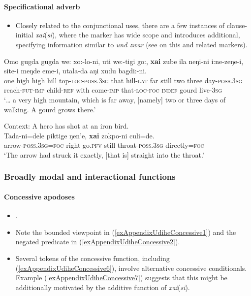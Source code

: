 \paragraph{Specificational adverb}\label{appendixUdiheSpecificational}
\begin{itemize}
	\item Closely related to the conjunctional uses, there are a few instances of clause-initial \mbox{\textit{xai}(\textit{si})}, where the marker has wide scope and introduces additional, specifying information similar to  \textit{und zwar} (see \cite{OneaVolodina2011} on this and related markers).
\end{itemize}

\begin{exe}
	\ex
	\gll Omo gugda gugda we: xo:-lo-ni, uti we:-tigi go:, \textbf{xai} zube ila neŋi-ni i:ne-zeŋe-i, site-i meŋde eme-i, utala-da aŋi xu:lu bagdi:-ni.\\
	one high high hill top-\textsc{loc}-\textsc{poss}.3\textsc{sg} that hill-\textsc{lat} far still two three day-\textsc{poss}.3\textsc{sg} reach-\textsc{fut}-\textsc{imp} child-\textsc{ref} with come-\textsc{imp} that-\textsc{loc}-\textsc{foc} \textsc{indef} gourd live-3\textsc{sg}\\ 
	\glt \lq … a very high mountain, which is far away, [namely] two or three days of walking. A gourd grows there.' \parencite[84, 89]{NikolaevaEtAl2003}

\ex
	Context: A hero has shot at an iron bird.\\
	\gll Tada-ni=dele piktige ŋen’e, \textbf{xai} zokpo-ni culi=de.\\
	arrow-\textsc{poss}.3\textsc{sg}=\textsc{foc} right go.\textsc{pfv} still throat-\textsc{poss}.3\textsc{sg} directly=\textsc{foc}\\
	\glt \lq The arrow had struck it exactly, [that is] straight into the throat.' \parencite[Sisam Zauli and the hero]{NikolaevaEtAl2019}
\end{exe}



\subsubsection{Broadly modal and interactional functions}
\paragraph{Concessive apodoses}
\label{appendixUdiheConcessiveConsequent}
\begin{itemize}
	\item \textcite[440]{NikolaevaTolskaya2001}.
	\item Note the bounded viewpoint in (\ref{exAppendixUdiheConcessive1}) and the negated predicate in (\ref{exAppendixUdiheConcessive2}).
		\item Several tokens of the concessive function, including (\ref{exAppendixUdiheConcessive6}), involve alternative concessive conditionals. Example (\ref{exAppendixUdiheConcessive7}) suggests that this might be additionally motivated by the additive function of \mbox{\textit{xai}(\textit{si})}.
\end{itemize}
	
